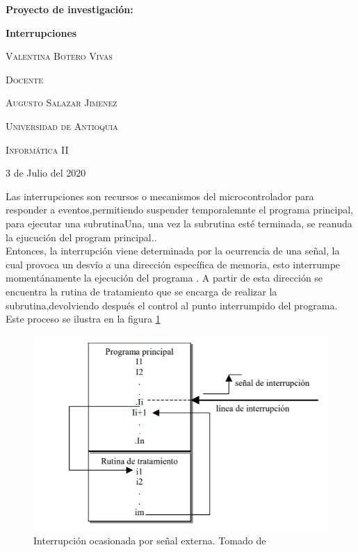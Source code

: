 \documentclass{report}   %
\begin{document}
\begin{titlepage}    %
	\centering
	{\huge\bfseries Proyecto de investigación: \par}
	\vspace{1cm}
	{\huge\bfseries  Interrupciones \par}
    \vspace{3cm}
    {\scshape\large Valentina Botero Vivas \par}
    \vspace{3cm}
      {\scshape\large Docente  \par}
	\vspace{0.5cm}
    {\scshape\large Augusto Salazar Jimenez  \par}
	\vspace{3cm}
	 {\scshape\large Universidad de Antioquia \par}
	\vspace{1cm}
    {\scshape\large Informática II  \par}
	\vspace{1cm}
	{\large 3 de Julio del 2020 \par}
\end{titlepage}


Las interrupciones son recursos o mecanismos del microcontrolador para responder a eventos,permitiendo suspender temporalemnte el programa principal, para ejecutar una subrutinaUna, una vez la subrutina esté terminada, se reanuda la ejucución del program principal..\\

Entonces, la interrupción viene determinada por la ocurrencia de una señal, la cual provoca un desvío a una dirección específica de memoria, esto interrumpe momentánamente la ejecución del programa . A partir de esta dirección se encuentra la rutina de tratamiento que se encarga de realizar la subrutina,devolviendo después el control al punto interrumpido del programa. Este proceso se ilustra en la figura \ref{fig:Interrupción}

\begin{figure}[H]
      \centering
      \captionsetup{justification=centering}
      \includegraphics[scale=0.7]{1.PNG}
      \caption{Interrupción ocasionada por señal externa. Tomado de \cite{3}}
      \label{fig:Interrupción}
   \end{figure}
\end{document}
